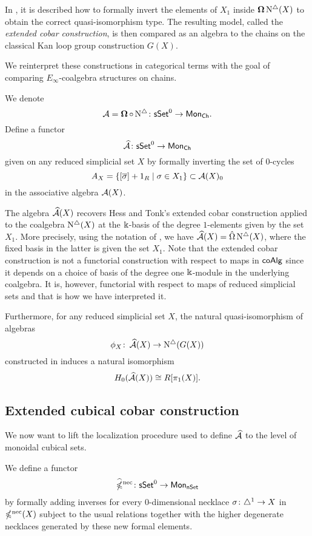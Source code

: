 In \cite{hess2010cobar}, it is described how to formally invert the elements of $X_1$ inside $\operatorname{\mathbf{\Omega}} \operatorname{N^{\triangle}}(X)$ to obtain the correct quasi-isomorphism type.
The resulting model, called the \textit{extended cobar construction}, is then compared as an algebra to the chains on the classical Kan loop group construction $G(X)$.

We reinterpret these constructions in categorical terms with the goal of comparing $E_{\infty}$-coalgebra structures on chains. 

We denote
$$\operatorname{\mathcal{A}} = \operatorname{\mathbf{\Omega}} \circ \operatorname{N^{\triangle}} \colon \mathsf{sSet}^0 \to \mathsf{Mon}_{\mathsf{Ch}}.$$
Define a functor
\begin{equation*}
\operatorname{\mathcal{\widehat{A}}} \colon \mathsf{sSet}^0 \to \mathsf{Mon}_{\mathsf{Ch}}
\end{equation*}
given on any reduced simplicial set $X$ by formally inverting the set of $0$-cycles
\begin{equation*}
A_X = \{ [\overline{\sigma}]+1_R \mid \sigma \in X_1 \} \subset \operatorname{\mathcal{A}}(X)_0
\end{equation*}
in the associative algebra $\operatorname{\mathcal{A}}(X)$.

The algebra $\operatorname{\mathcal{\widehat{A}}}(X)$ recovers Hess and Tonk's extended cobar construction applied to the coalgebra $\operatorname{N^{\triangle}}(X)$ at the $\Bbbk$-basis of the degree $1$-elements given by the set $X_1$. More precisely, using the notation of \cite{hess2010cobar}, we have $\operatorname{\mathcal{\widehat{A}}}(X)= \hat{\Omega}\operatorname{N^{\triangle}}(X)$, where the fixed basis in the latter is given the set $X_1$. Note that the extended cobar construction is not a functorial construction with respect to maps in $\mathsf{coAlg}$ since it depends on a choice of basis of the degree one $\Bbbk$-module in the underlying coalgebra. It is, however, functorial with respect to maps of reduced simplicial sets and that is how we have interpreted it. 

Furthermore, for any reduced simplicial set $X$, the natural quasi-isomorphism of algebras 
\[\phi_X \colon \operatorname{\mathcal{\widehat{A}}}(X) \to \operatorname{N^{\triangle}}(G(X)) \] 
constructed in \cite{hess2010cobar} induces a natural isomorphism
\begin{equation*}
H_0(\operatorname{\mathcal{\widehat{A}}}(X)) \cong R[\pi_1(X)].
\end{equation*}


\subsection{Extended cubical cobar construction}
We now want to lift the localization procedure used to define $\operatorname{\mathcal{\widehat{A}}}$ to the level of monoidal cubical sets.

We define a functor
\begin{equation*}
\operatorname{\widehat{\mathbb{\Omega}}^{\mathrm{nec}}} \colon \mathsf{sSet}^0 \to \mathsf{Mon}_{\mathsf{nSet}}
\end{equation*}
by formally adding inverses for every $0$-dimensional necklace $\sigma \colon \triangle^1 \to X$ in $\operatorname{\mathbb{\Omega}^{\mathrm{nec}}}(X)$ subject to the usual relations together with the higher degenerate necklaces generated by these new formal elements. 

